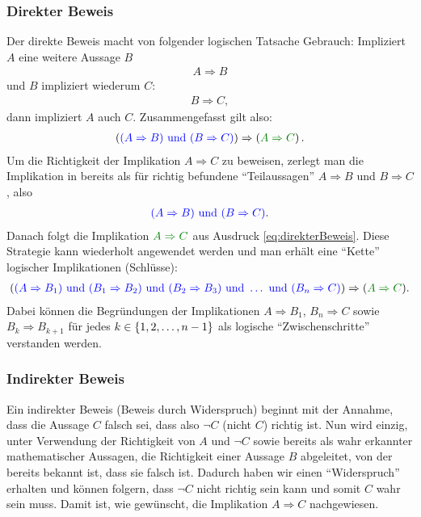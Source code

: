 \subsubsection{Direkter Beweis}
Der direkte Beweis macht von folgender logischen Tatsache Gebrauch: Impliziert $A$ eine weitere Aussage $B$
\begin{align*}
    A \Rightarrow B
\end{align*}
und $B$ impliziert wiederum $C$:
\begin{align*}
    B \Rightarrow C,
\end{align*}
dann impliziert $A$ auch $C$. Zusammengefasst gilt also:
\begin{align}\label{eq:direkterBeweis}
     \lr{\textcolor{Blue}{(A\Rightarrow B) \text{ und } (B\Rightarrow C)}} \Rightarrow \lr{\textcolor{Green}{A\Rightarrow C}}.
\end{align}
Um die Richtigkeit der Implikation $A\Rightarrow C$ zu beweisen, zerlegt man die Implikation in bereits als für richtig befundene \enquote{Teilaussagen} $A\Rightarrow B$ und $B\Rightarrow C$, also
\begin{align*}
    \textcolor{Blue}{(A\Rightarrow B) \text{ und } (B\Rightarrow C)}.
\end{align*}
Danach folgt die Implikation $\textcolor{Green}{A\Rightarrow C}$ aus Ausdruck \ref{eq:direkterBeweis}. Diese Strategie kann wiederholt angewendet werden und man erhält eine \enquote{Kette} logischer Implikationen (Schlüsse):
\begin{align*}
    \lr{ \textcolor{Blue}{(A\Rightarrow B_1) \text{ und } (B_1\Rightarrow B_2) \text{ und } (B_2\Rightarrow B_3) \text{ und } \ldots \text{ und } (B_n\Rightarrow C)} } \Rightarrow (\textcolor{Green}{A\Rightarrow C}).
\end{align*}
Dabei können die Begründungen der Implikationen $A\Rightarrow B_1$, $B_n\Rightarrow C$ sowie $B_k\Rightarrow B_{k+1}$ für jedes $k\in\left\{1,2,\ldots, n-1\right\}$ als logische \enquote{Zwischenschritte} verstanden werden.

\subsubsection{Indirekter Beweis}
Ein indirekter Beweis (Beweis durch Widerspruch) beginnt mit der Annahme, dass die Aussage $C$ falsch sei, dass also $\neg{C}$ (nicht $C$) richtig ist. Nun wird einzig, unter Verwendung der Richtigkeit von $A$ und $\neg{C}$ sowie bereits als wahr erkannter mathematischer Aussagen, die Richtigkeit einer Aussage $B$ abgeleitet, von der bereits bekannt ist, dass sie falsch ist. Dadurch haben wir einen \enquote{Widerspruch} erhalten und können folgern, dass $\neg{C}$ nicht richtig sein kann und somit $C$ wahr sein muss. Damit ist, wie gewünscht, die Implikation $A\Rightarrow C$ nachgewiesen.

